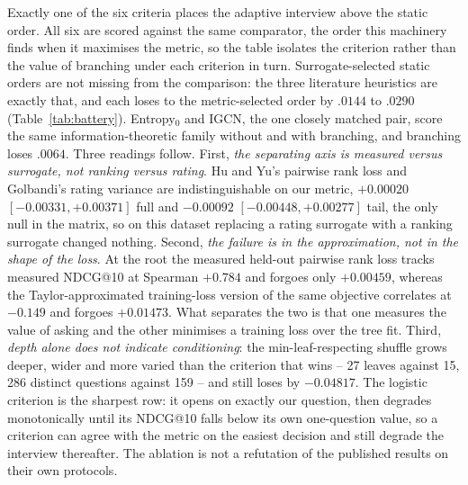 \documentclass[runningheads]{llncs}
\begin{document}
Exactly one of the six criteria places the adaptive interview above the static order. All six are
scored against the same comparator, the order this machinery finds when it maximises the metric, so
the table isolates the criterion rather than the value of branching under each criterion in turn.
Surrogate-selected static orders are not missing from the comparison: the three literature
heuristics are exactly that, and each loses to the metric-selected order by $.0144$ to $.0290$
(Table~\ref{tab:battery}). Entropy$_0$ and IGCN, the one closely matched pair, score the same
information-theoretic family without and with branching, and branching loses $.0064$. Three readings follow. First, \emph{the separating axis is measured
versus surrogate, not ranking versus rating}. Hu and Yu's pairwise rank loss and Golbandi's rating
variance are indistinguishable on our metric, $+0.00020$ $[-0.00331,+0.00371]$ full and $-0.00092$
$[-0.00448,+0.00277]$ tail, the only null in the matrix, so on this dataset replacing a rating surrogate with a ranking surrogate changed
nothing. Second, \emph{the failure is in the approximation, not in the shape of the loss}. At the root the
measured held-out pairwise rank loss tracks measured NDCG@10 at Spearman $+0.784$ and forgoes only
$+0.00459$, whereas the Taylor-approximated training-loss version of the same objective correlates at
$-0.149$ and forgoes $+0.01473$. What separates the two is that one measures the value of asking and
the other minimises a training loss over the tree fit.
Third, \emph{depth alone does not indicate conditioning}: the min-leaf-respecting shuffle grows deeper, wider and
more varied than the criterion that wins -- 27 leaves against 15, 286 distinct questions against 159
-- and still loses by $-0.04817$. The logistic criterion is the sharpest
row: it opens on exactly our question, then degrades monotonically until its NDCG@10 falls below
its own one-question value, so a criterion can agree with the metric on the easiest decision and
still degrade the interview thereafter. The ablation is not a refutation of the published results on
their own protocols.
\end{document}
